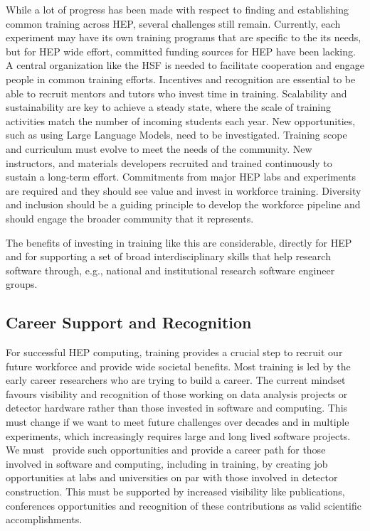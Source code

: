 \documentclass[10pt,a4paper]{article}
\begin{document}
While a lot of progress has been made with respect to finding and establishing
common training across HEP, several challenges still remain. Currently, each
experiment may have its own training programs that are specific to the its
needs, but for HEP wide effort, committed funding sources for HEP have been
lacking. A central organization like the HSF is needed to facilitate cooperation
and engage people in common training efforts. Incentives and recognition are
essential to be able to recruit mentors and tutors who invest time in training.
Scalability and sustainability are key to achieve a steady state, where the
scale of training activities match the number of incoming students each year.
New opportunities, such as using Large Language Models, need to be investigated.
Training scope and curriculum must evolve to meet the needs of the community.
New instructors, and materials developers recruited and trained continuously to
sustain a long-term effort. Commitments from major HEP labs and experiments are
required and they should see value and invest in workforce training. Diversity
and inclusion should be a guiding principle to develop the workforce pipeline
and should engage the broader community that it represents.

The benefits of investing in training like this are considerable, directly for
HEP and for supporting a set of broad interdisciplinary skills that help
research software through, e.g., national and institutional research software
engineer groups.

\subsection{Career Support and
Recognition}\label{career-support-and-recognition}

For successful HEP computing, training provides a crucial step to recruit our
future workforce and provide wide societal benefits. Most training is led by the
early career researchers who are trying to build a career. The current mindset
favours visibility and recognition of those working on data analysis projects or
detector hardware rather than those invested in software and computing. This
must change if we want to meet future challenges over decades and in multiple
experiments, which increasingly requires large and long lived software projects.
We must~\cite{hsfcwp} provide such opportunities and provide a career path for those
involved in software and computing, including in training, by creating job
opportunities at labs and universities on par with those involved in detector
construction. This must be supported by increased visibility like publications,
conferences opportunities and recognition of these contributions as valid
scientific accomplishments.
\end{document}

